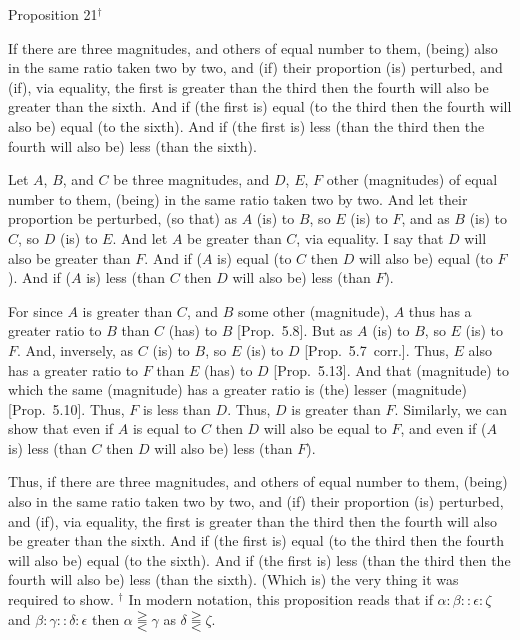 
\begin{center}
{\large Proposition 21}$^\dag$
\end{center}

If there are three magnitudes, and others of equal
 number to them, (being) also in the same ratio taken two by two, and (if)
their proportion (is) perturbed, and (if), via equality,
the first is greater than the third then the fourth will also
be greater than the sixth. And if (the first is) equal (to the third then the
fourth will also be) equal (to the sixth).
And if (the first is) less (than the third then the fourth will also be) less (than
the sixth).

\epsfysize=0.7in
\centerline{}

Let $A$, $B$, and $C$ be three magnitudes, and $D$, $E$, $F$ other (magnitudes)
of equal number to them, (being) in the same ratio taken two by two. And let their proportion be perturbed, (so that) as $A$ (is) to $B$, so $E$ (is) to $F$, and as
$B$ (is) to $C$, so $D$ (is) to $E$. And let $A$  be greater than $C$, via equality. I
say that $D$ will also be greater than $F$.
 And if ($A$ is) equal (to $C$ then $D$ will also be) equal (to $F$). And
if ($A$ is) less (than $C$ then $D$ will also be) less (than $F$).

For since $A$ is greater than $C$, and $B$ some other (magnitude),  $A$ thus
has a greater ratio to $B$ than $C$ (has) to $B$ [Prop.~5.8]. But as $A$ (is) to $B$,
so $E$ (is) to $F$. And, inversely, as $C$ (is) to $B$, so $E$ (is) to $D$ [Prop.~5.7~corr.]. Thus, $E$ also has a greater
ratio to $F$ than $E$ (has) to $D$ [Prop.~5.13]. And that (magnitude) to which the same (magnitude)  has a greater ratio  is (the) lesser (magnitude) [Prop.~5.10].
Thus, $F$ is less than $D$. Thus, $D$ is greater than $F$. Similarly, we can show that
even if $A$ is equal to $C$ then $D$ will also
be equal to $F$, and even if ($A$ is) less (than $C$ then $D$ will also
be) less (than $F$).

Thus, if there are three magnitudes, and others of equal
 number to them, (being) also in the same ratio taken two by two, and (if)
their proportion (is) perturbed, and (if), via equality,
the first is greater than the third then the fourth will also
be greater than the sixth. And if (the first is) equal (to the third then the fourth
will also be) equal (to the sixth).
And if (the first is) less (than the third then the fourth will also be) less (than
the sixth). (Which is) the very thing it was required to show.
{\footnotesize \noindent$^\dag$ In modern notation, this proposition
reads that if $\alpha:\beta::\epsilon:\zeta$ and $\beta:\gamma::\delta:\epsilon$ then $\alpha\gtreqqless\gamma$ as $\delta\gtreqqless\zeta$.}

